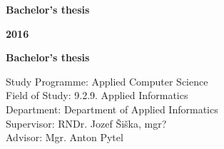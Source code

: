 \begin{center}
\centerline{\LARGE\sc\textbf\skola}
\sc\LARGE\textbf\fakulta
\end{center}

\vspace*{8cm}

\begin{center}
\begin{minipage}{0.8\textwidth}
\begin{center}
 \LARGE\sc\textbf\nazov
 \vspace{1em}
 \centerline{\Large\bf Bachelor’s thesis}
\end{center}
\end{minipage}
\end{center}

\vfill
\noindent
 {\bf 2016}  \hfill {\bf \autor}
\thispagestyle{empty}



\newpage
\begin{center}
\centerline{\LARGE\sc\textbf\skola}
\sc\LARGE\textbf\fakulta
\end{center}

\vspace*{8cm}

\begin{center}
\begin{minipage}{0.8\textwidth}
\begin{center}
 \LARGE\sc\textbf\nazov 
\end{center}
\vspace{1em}
\centerline{\Large\bf Bachelor’s thesis}
\end{minipage}
\end{center}

\vspace{5cm}

\linespread{1.3}%
\selectfont

\noindent
Study Programme: \hspace{0.8em} Applied Computer Science\\
Field of Study:  \hspace{2.4em} 9.2.9. Applied Informatics\\
Department:  \hspace{3.3em} Department of Applied Informatics\\
Supervisor:  \hspace{3.7em} RNDr. Jozef Šiška, mgr?\\
Advisor:	 \hspace{4.8em} Mgr. Anton Pytel

